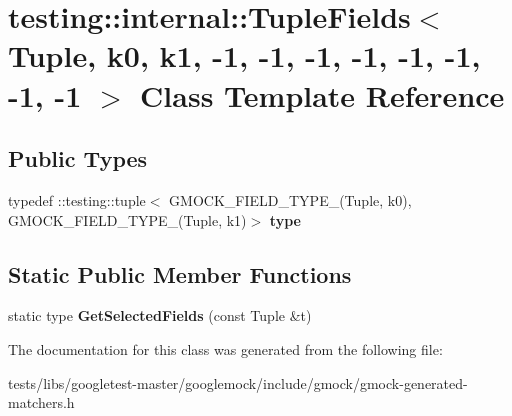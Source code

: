 \hypertarget{classtesting_1_1internal_1_1TupleFields_3_01Tuple_00_01k0_00_01k1_00_01-1_00_01-1_00_01-1_00_01-fb5812c507091ce72ac353453b83394d}{}\section{testing\+:\+:internal\+:\+:Tuple\+Fields$<$ Tuple, k0, k1, -\/1, -\/1, -\/1, -\/1, -\/1, -\/1, -\/1, -\/1 $>$ Class Template Reference}
\label{classtesting_1_1internal_1_1TupleFields_3_01Tuple_00_01k0_00_01k1_00_01-1_00_01-1_00_01-1_00_01-fb5812c507091ce72ac353453b83394d}
\subsection*{Public Types}
\begin{DoxyCompactItemize}
\item 
\mbox{\label{classtesting_1_1internal_1_1TupleFields_3_01Tuple_00_01k0_00_01k1_00_01-1_00_01-1_00_01-1_00_01-fb5812c507091ce72ac353453b83394d_ad0dd4e84d48ec9a5ef262cf32f6979f9}} 
typedef \+::testing\+::tuple$<$ G\+M\+O\+C\+K\+\_\+\+F\+I\+E\+L\+D\+\_\+\+T\+Y\+P\+E\+\_\+(Tuple, k0), G\+M\+O\+C\+K\+\_\+\+F\+I\+E\+L\+D\+\_\+\+T\+Y\+P\+E\+\_\+(Tuple, k1)$>$ {\bfseries type}
\end{DoxyCompactItemize}
\subsection*{Static Public Member Functions}
\begin{DoxyCompactItemize}
\item 
\mbox{\label{classtesting_1_1internal_1_1TupleFields_3_01Tuple_00_01k0_00_01k1_00_01-1_00_01-1_00_01-1_00_01-fb5812c507091ce72ac353453b83394d_aff1691053cc880fe84f27cb6a1c5680f}} 
static type {\bfseries Get\+Selected\+Fields} (const Tuple \&t)
\end{DoxyCompactItemize}


The documentation for this class was generated from the following file\+:\begin{DoxyCompactItemize}
\item 
tests/libs/googletest-\/master/googlemock/include/gmock/gmock-\/generated-\/matchers.\+h\end{DoxyCompactItemize}
